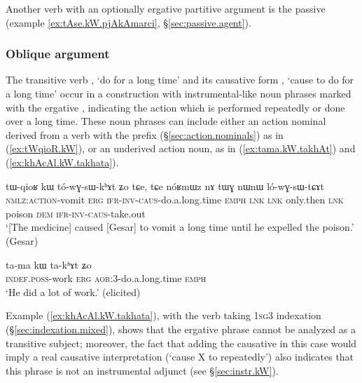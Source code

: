 Another verb with an optionally ergative partitive argument is the passive  (example \ref{ex:tAse.kW.pjAkAmarci}, §\ref{sec:passive.agent}).

\subsubsection{Oblique argument} \label{sec:oblique.kW}
 The transitive verb , `do for a long time' and its causative form , `cause to do for a long time' occur in a construction with instrumental-like noun phrases marked with the ergative , indicating the action which is performed repeatedly or done over a long time. These noun phrases can include either an action nominal derived from a verb with the prefix  (§\ref{sec:action.nominals}) as in (\ref{ex:tWqioR.kW}), or an underived action noun, as in (\ref{ex:tama.kW.takhAt}) and (\ref{ex:khAcAl.kW.takhata}).  
 
  \begin{exe}
\ex \label{ex:tWqioR.kW}
\gll tɯ-qioʁ kɯ tó-wɣ-sɯ-kʰɤt ʑo tɕe, tɕe nóʁmɯz nɤ tɯɣ nɯnɯ ló-wɣ-sɯ-tɕɤt  \\
\textsc{nmlz}:\textsc{action}-vomit \textsc{erg} \textsc{ifr}-\textsc{inv}-\textsc{caus}-do.a.long.time \textsc{emph} \textsc{lnk} \textsc{lnk} only.then \textsc{lnk} poison \textsc{dem} \textsc{ifr}-\textsc{inv}-\textsc{caus}-take.out \\
\glt `[The medicine] caused [Gesar] to vomit a long time until he expelled the poison.' (Gesar)
\end{exe}

  \begin{exe}
\ex \label{ex:tama.kW.takhAt}
\gll ta-ma kɯ ta-kʰɤt ʑo  \\
\textsc{indef}.\textsc{poss}-work \textsc{erg} \textsc{aor}:3\flobv{}-do.a.long.time \textsc{emph} \\
\glt `He did a lot of work.' (elicited)
\end{exe}

Example (\ref{ex:khAcAl.kW.takhata}), with the verb   taking \textsc{1sg}\fl{}3 indexation (§\ref{sec:indexation.mixed}), shows that the ergative phrase cannot be analyzed as a transitive subject; moreover, the fact that adding the causative in this case would imply a real causative interpretation (`cause X to repeatedly') also indicates that this phrase is not an instrumental adjunct (see §\ref{sec:instr.kW}).


